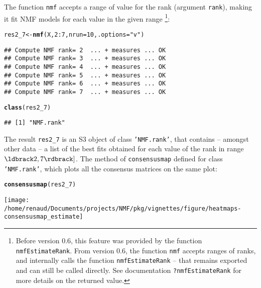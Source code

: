 \documentclass[a4paper]{article}\usepackage{graphicx, color}
\makeatletter
\def\maxwidth{ %
  \ifdim\Gin@nat@width>\linewidth
    \linewidth
  \else
    \Gin@nat@width
  \fi
}
\newcommand{\hlfunctioncall}[1]{\textcolor[rgb]{0.501960784313725,0,0.329411764705882}{\textbf{#1}}}%
\newcommand{\hlstring}[1]{\textcolor[rgb]{0.6,0.6,1}{#1}}%
\newenvironment{kframe}{%
 \def\at@end@of@kframe{}%
 \ifinner\ifhmode%
  \def\at@end@of@kframe{\end{minipage}}%
  \begin{minipage}{\columnwidth}%
 \fi\fi%
 \def\FrameCommand##1{\hskip\@totalleftmargin \hskip-\fboxsep
 \colorbox{shadecolor}{##1}\hskip-\fboxsep
     \hskip-\linewidth \hskip-\@totalleftmargin \hskip\columnwidth}%
 \MakeFramed {\advance\hsize-\width
   \@totalleftmargin\z@ \linewidth\hsize
   \@setminipage}}%
 {\par\unskip\endMakeFramed%
 \at@end@of@kframe}
\newenvironment{knitrout}{}{} %
\let\code=\texttt
\makeatother
\begin{document}
The function \code{nmf} accepts a range of value for the rank (argument \code{rank}), 
making it fit NMF models for each value in the given range
\footnote{Before version 0.6, this feature was provided by the function \code{nmfEstimateRank}.
From version 0.6, the function \code{nmf} accepts ranges of ranks, and internally 
calls the function \code{nmfEstimateRank} -- that remains exported and can still 
be called directly. 
See documentation \code{?nmfEstimateRank} for more details on the returned value.}:

\begin{knitrout}
\color{fgcolor}\begin{kframe}
\begin{alltt}
res2_7 <- \hlfunctioncall{nmf}(X, 2:7, nrun = 10, .options = \hlstring{"v"})
\end{alltt}
\begin{verbatim}
## Compute NMF rank= 2  ... + measures ... OK
## Compute NMF rank= 3  ... + measures ... OK
## Compute NMF rank= 4  ... + measures ... OK
## Compute NMF rank= 5  ... + measures ... OK
## Compute NMF rank= 6  ... + measures ... OK
## Compute NMF rank= 7  ... + measures ... OK
\end{verbatim}
\begin{alltt}
\hlfunctioncall{class}(res2_7)
\end{alltt}
\begin{verbatim}
## [1] "NMF.rank"
\end{verbatim}
\end{kframe}
\end{knitrout}


The result \code{res2\_7} is an S3 object of class \code{'NMF.rank'}, 
that contains -- amongst other data -- a list of the best fits obtained for each 
value of the rank in range $\ldbrack 2, 7\rdbrack]$.
The method of \code{consensusmap} defined for class \code{'NMF.rank'}, 
which plots all the consensus matrices on the same plot: 

\begin{knitrout}
\color{fgcolor}\begin{kframe}
\begin{alltt}
\hlfunctioncall{consensusmap}(res2_7)
\end{alltt}
\end{kframe}
\texttt{[image: /home/renaud/Documents/projects/NMF/pkg/vignettes/figure/heatmaps-consensusmap\_estimate]} 

\end{knitrout}
\end{document}
